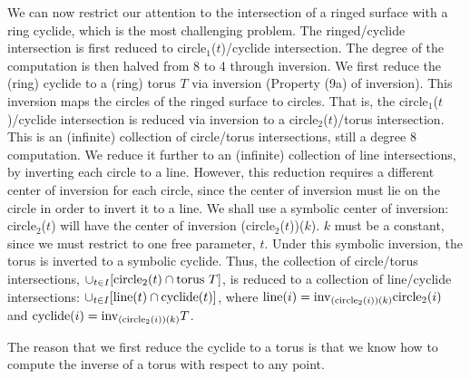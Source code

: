 We can now restrict our attention to the
intersection of a ringed surface with a ring cyclide, which is the most
challenging problem.
The ringed/cyclide intersection 
is first reduced to circle$_1$($t$)/cyclide intersection.
The degree of the computation is then halved from 8 to 4 through inversion.
We first reduce the (ring) cyclide to a (ring) torus $T$ via inversion
(Property (9a) of inversion).
This inversion maps the circles of the ringed surface to circles.
That is, the circle$_1$($t$)/cyclide intersection is reduced via inversion
to a circle$_2$($t$)/torus intersection.
This is an (infinite) collection of circle/torus intersections,
still a degree 8 computation.
We reduce it further to an (infinite) collection of line intersections,
by inverting each circle to a line.
However, this reduction 
requires a different center of inversion for each circle, 
since the center of inversion must lie on the circle in order to invert it
to a line.
We shall use a symbolic center of inversion: circle$_2$($t$) 
will have the center of inversion (circle$_2$($t$))($k$).
$k$ must be a constant, since we must restrict to one free parameter, $t$.
Under this symbolic inversion, the torus is inverted to a symbolic cyclide.
Thus, the collection of circle/torus intersections,
$\cup_{t \in I} [{\rm circle}_{2}(t) \cap {\rm torus}\ T]$, 
is reduced to a collection of line/cyclide intersections: 
$\cup_{t \in I} [{\rm line}(t) \cap {\rm cyclide}(t)]$,
where ${\rm line}(i) = {\rm inv}_{({\rm circle}_{2}(i))(k)}{\rm circle}_{2}(i)$
and ${\rm cyclide}(i) = {\rm inv}_{({\rm circle}_{2}(i))(k)} T$.

\begin{rmk}
The reason that we first reduce the cyclide to a torus 
is that we know how to compute the inverse of a torus with respect to any 
point.
\end{rmk}


